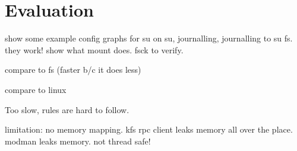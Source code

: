 \section{Evaluation}
\label{sec:eval}

show some example config graphs for su on su, journalling, journalling
to su fs. they work! show what mount does. fsck to verify.

compare to fs (faster b/c it does less)

compare to linux

Too slow, rules are hard to follow.

limitation: no memory mapping. kfs rpc client leaks memory all over
the place. modman leaks memory. not thread safe!
